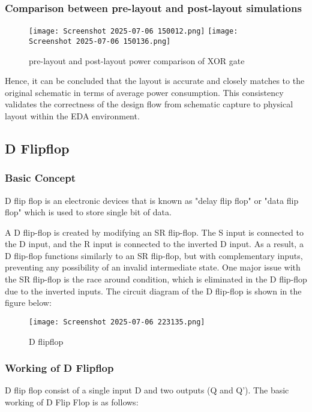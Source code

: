 \documentclass[12pt]{article}
\begin{document}
    \subsubsection{Comparison between pre-layout and post-layout simulations}
      \begin{figure}[H]
          \centering
          \texttt{[image: Screenshot 2025-07-06 150012.png]}
          \texttt{[image: Screenshot 2025-07-06 150136.png]}
          \caption{pre-layout and post-layout power comparison of XOR gate}
          \label{fig:enter-label}
      \end{figure}
       Hence, it can be concluded that the layout is accurate and closely matches to the original schematic in terms of average power consumption. This consistency validates the correctness of the design flow from schematic capture to physical layout within the EDA environment.


     \subsection{\large{\textbf{D Flipflop}}}
     \subsubsection{\textbf{Basic Concept}}
        D flip flop is an electronic devices that is known as "delay flip flop" or "data flip flop" which is used to store single bit of data.
    
        A D flip-flop is created by modifying an SR flip-flop. The S input is connected to the D input, and the R input is connected to the inverted D input. As a result, a D flip-flop functions similarly to an SR flip-flop, but with complementary inputs, preventing any possibility of an invalid intermediate state. One major issue with the SR flip-flop is the race around condition, which is eliminated in the D flip-flop due to the inverted inputs. The circuit diagram of the D flip-flop is shown in the figure below:
    \begin{figure}[H]
        \centering
        \texttt{[image: Screenshot 2025-07-06 223135.png]}
        \caption{D flipflop}
        \label{fig:enter-label}
    \end{figure}

    \subsubsection{\textbf{Working of D Flipflop}}
    D flip flop consist of a single input D and two outputs (Q and Q'). The basic working of D Flip Flop is as follows:
\end{document}
